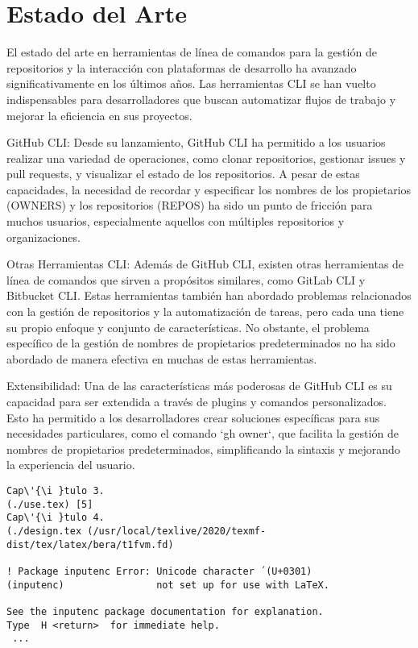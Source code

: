 \section{Estado del Arte}
El estado del arte en herramientas de línea de comandos para la gestión de repositorios y la interacción con plataformas de desarrollo ha avanzado significativamente en los últimos años. Las herramientas CLI se han vuelto indispensables para desarrolladores que buscan automatizar flujos de trabajo y mejorar la eficiencia en sus proyectos.

GitHub CLI: Desde su lanzamiento, GitHub CLI ha permitido a los usuarios realizar una variedad de operaciones, como clonar repositorios, gestionar issues y pull requests, y visualizar el estado de los repositorios. A pesar de estas capacidades, la necesidad de recordar y especificar los nombres de los propietarios (OWNERS) y los repositorios (REPOS) ha sido un punto de fricción para muchos usuarios, especialmente aquellos con múltiples repositorios y organizaciones.

Otras Herramientas CLI: Además de GitHub CLI, existen otras herramientas de línea de comandos que sirven a propósitos similares, como GitLab CLI y Bitbucket CLI. Estas herramientas también han abordado problemas relacionados con la gestión de repositorios y la automatización de tareas, pero cada una tiene su propio enfoque y conjunto de características. No obstante, el problema específico de la gestión de nombres de propietarios predeterminados no ha sido abordado de manera efectiva en muchas de estas herramientas.

Extensibilidad: Una de las características más poderosas de GitHub CLI es su capacidad para ser extendida a través de plugins y comandos personalizados. Esto ha permitido a los desarrolladores crear soluciones específicas para sus necesidades particulares, como el comando `gh owner`, que facilita la gestión de nombres de propietarios predeterminados, simplificando la sintaxis y mejorando la experiencia del usuario.

\begin{verbatim}
Cap\'{\i }tulo 3.
(./use.tex) [5]
Cap\'{\i }tulo 4.
(./design.tex (/usr/local/texlive/2020/texmf-dist/tex/latex/bera/t1fvm.fd)

! Package inputenc Error: Unicode character ́ (U+0301)
(inputenc)                not set up for use with LaTeX.

See the inputenc package documentation for explanation.
Type  H <return>  for immediate help.
 ...                              
\end{verbatim}